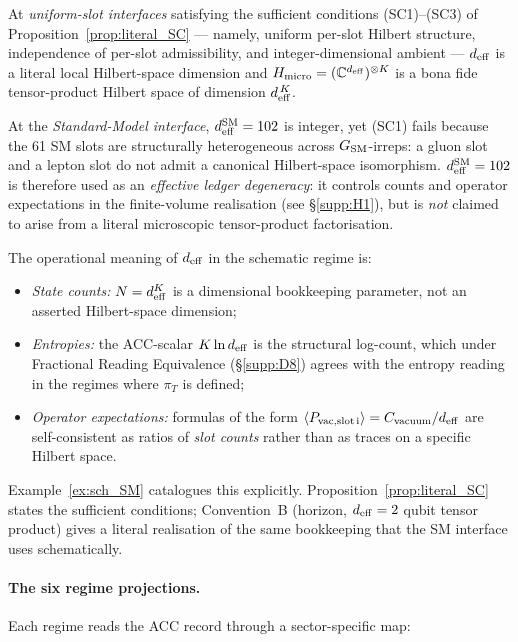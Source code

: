 \documentclass[11pt]{article}
\theoremstyle{plain}
\theoremstyle{definition}
\theoremstyle{remark}
\begin{document}
\begin{apfbox}[title={Interpretive status of $d_{\rm eff}$ (literal vs schematic)}]
\noindent At \emph{uniform-slot interfaces} satisfying the sufficient conditions (SC1)--(SC3) of Proposition~\ref{prop:literal_SC} --- namely, uniform per-slot Hilbert structure, independence of per-slot admissibility, and integer-dimensional ambient --- $d_{\rm eff}$ is a literal local Hilbert-space dimension and $H_{\rm micro} = (\mathbb{C}^{d_{\rm eff}})^{\otimes K}$ is a bona fide tensor-product Hilbert space of dimension $d_{\rm eff}^{\,K}$.

\noindent At the \emph{Standard-Model interface}, $d_{\rm eff}^{\rm SM} = 102$ is integer, yet (SC1) fails because the 61 SM slots are structurally heterogeneous across $G_{\rm SM}$-irreps: a gluon slot and a lepton slot do not admit a canonical Hilbert-space isomorphism.  $d_{\rm eff}^{\rm SM} = 102$ is therefore used as an \emph{effective ledger degeneracy}: it controls counts and operator expectations in the finite-volume realisation (see \S\ref{supp:H1}), but is \emph{not} claimed to arise from a literal microscopic tensor-product factorisation.

\noindent The operational meaning of $d_{\rm eff}$ in the schematic regime is:
\begin{itemize}[leftmargin=1.5em,itemsep=1pt,topsep=2pt]
  \item \emph{State counts:} $N = d_{\rm eff}^K$ is a dimensional bookkeeping parameter, not an asserted Hilbert-space dimension;
  \item \emph{Entropies:} the ACC-scalar $K \ln d_{\rm eff}$ is the structural log-count, which under Fractional Reading Equivalence (\S\ref{supp:D8}) agrees with the entropy reading in the regimes where $\pi_T$ is defined;
  \item \emph{Operator expectations:} formulas of the form $\langle P_{\rm vac,slot\,i} \rangle = C_{\rm vacuum}/d_{\rm eff}$ are self-consistent as ratios of \emph{slot counts} rather than as traces on a specific Hilbert space.
\end{itemize}

\noindent Example~\ref{ex:sch_SM} catalogues this explicitly.  Proposition~\ref{prop:literal_SC} states the sufficient conditions; Convention~B (horizon, $d_{\rm eff} = 2$ qubit tensor product) gives a literal realisation of the same bookkeeping that the SM interface uses schematically.
\end{apfbox}

\paragraph{The six regime projections.}  Each regime reads the ACC record through a sector-specific map:
\end{document}
